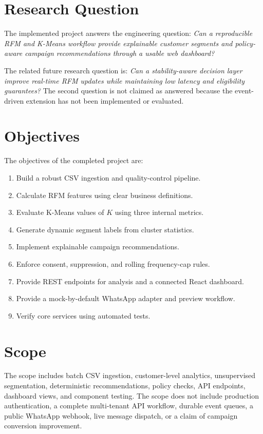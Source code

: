\documentclass[12pt,a4paper]{report}
\begin{document}
\section{Research Question}
The implemented project answers the engineering question: \emph{Can a reproducible RFM and K-Means workflow provide explainable customer segments and policy-aware campaign recommendations through a usable web dashboard?}

The related future research question is: \emph{Can a stability-aware decision layer improve real-time RFM updates while maintaining low latency and eligibility guarantees?} The second question is not claimed as answered because the event-driven extension has not been implemented or evaluated.

\section{Objectives}
The objectives of the completed project are:
\begin{enumerate}
\item Build a robust CSV ingestion and quality-control pipeline.
\item Calculate RFM features using clear business definitions.
\item Evaluate K-Means values of $K$ using three internal metrics.
\item Generate dynamic segment labels from cluster statistics.
\item Implement explainable campaign recommendations.
\item Enforce consent, suppression, and rolling frequency-cap rules.
\item Provide REST endpoints for analysis and a connected React dashboard.
\item Provide a mock-by-default WhatsApp adapter and preview workflow.
\item Verify core services using automated tests.
\end{enumerate}

\section{Scope}
The scope includes batch CSV ingestion, customer-level analytics, unsupervised segmentation, deterministic recommendations, policy checks, API endpoints, dashboard views, and component testing. The scope does not include production authentication, a complete multi-tenant API workflow, durable event queues, a public WhatsApp webhook, live message dispatch, or a claim of campaign conversion improvement.
\end{document}
